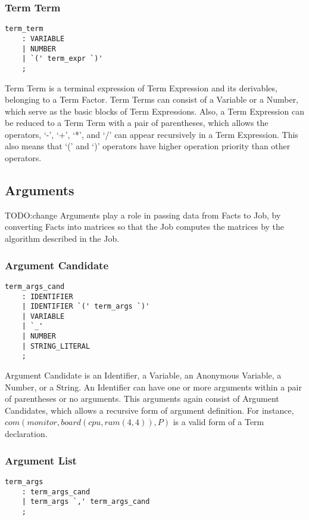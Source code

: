 \documentclass[prodmode,acmtecs]{acmsmall}
\begin{document}
\subsubsection{Term Term}
\begin{lstlisting}
term_term
	: VARIABLE
	| NUMBER
	| `(' term_expr `)'
	;
\end{lstlisting}

Term Term is a terminal expression of Term Expression and its derivables,
belonging to a Term Factor.  Term Terms can consist of a Variable or a
Number, which serve as the basic blocks of Term Expressions.  Also, a Term
Expression can be reduced to a Term Term with a pair of parentheses, which
allows the operators, `-', `+', `*', and `/' can appear recursively in a
Term Expression.  This also means that `(' and `)' operators have higher
operation priority than other operators.
\medskip

\subsection{Arguments}
TODO:change
Arguments play a role in passing data from Facts to Job, by converting Facts
into matrices so that the Job computes the matrices by the algorithm
described in the Job.

\subsubsection{Argument Candidate}
\begin{lstlisting}
term_args_cand
	: IDENTIFIER
	| IDENTIFIER `(' term_args `)'
	| VARIABLE
	| `_'
	| NUMBER
	| STRING_LITERAL
	;
\end{lstlisting}

Argument Candidate is an Identifier, a Variable, an Anonymous
Variable, a Number, or a String.  An Identifier can have one
or more arguments within a pair of parentheses or no arguments.
This arguments again consist of Argument Candidates, which
allows a recursive form of argument definition.  For instance, 
$com(monitor, board(cpu, ram(4, 4)), P)$ is a valid form
of a Term declaration.
\medskip

\subsubsection{Argument List}
\begin{lstlisting}
term_args
	: term_args_cand
	| term_args `,' term_args_cand
	;
\end{lstlisting}
\end{document}
